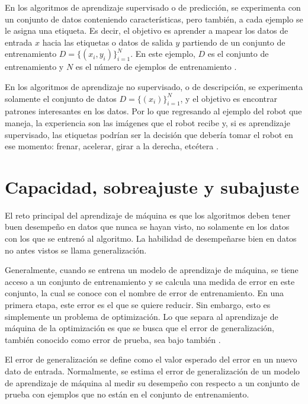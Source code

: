 \vspace{1em}

En los algoritmos de aprendizaje supervisado o de predicción, se experimenta con un conjunto de datos conteniendo características, pero también, a cada ejemplo se le asigna una etiqueta. Es decir, el objetivo es aprender a mapear los datos de entrada $x$ hacia las etiquetas o datos de salida $y$ partiendo de un conjunto de entrenamiento $D = \{(x_i, y_i)\}_{i=1}^N$. En este ejemplo, $D$ es el conjunto de entrenamiento y $N$ es el número de ejemplos de entrenamiento \cite{Murphy:2012:MLP:2380985}.

\vspace{1em}

En los algoritmos de aprendizaje no supervisado, o de descripción, se experimenta solamente el conjunto de datos $D = \{(x_i)\}_{i=1}^N$, y el objetivo es encontrar patrones interesantes en los datos. Por lo que regresando al ejemplo del robot que maneja, la experiencia son las imágenes que el robot recibe y, si es aprendizaje supervisado, las etiquetas podrían ser la decisión que debería tomar el robot en ese momento: frenar, acelerar, girar a la derecha, etcétera \cite{Murphy:2012:MLP:2380985}.

\section{Capacidad, sobreajuste y subajuste}
El reto principal del aprendizaje de máquina es que los algoritmos deben tener buen desempeño en datos que nunca se hayan visto, no solamente en los datos con los que se entrenó al algoritmo. La habilidad de desempeñarse bien en datos no antes vistos se llama generalización.


\vspace{1em}

Generalmente, cuando se entrena un modelo de aprendizaje de máquina, se tiene acceso a un conjunto de entrenamiento y se calcula una medida de error en este conjunto, la cual se conoce con el nombre de error de entrenamiento. En una primera etapa, este error es el que se quiere reducir. Sin embargo, esto es simplemente un problema de optimización. Lo que separa al aprendizaje de máquina de la optimización es que se busca que el error de generalización, también conocido como error de prueba, sea bajo también \cite{goodfellow-et-al-2016}.

\vspace{1em}

El error de generalización se define como el valor esperado del error en un nuevo dato de entrada. Normalmente, se estima el error de generalización de un modelo de aprendizaje de máquina al medir su desempeño con respecto a un conjunto de prueba con ejemplos que no están en el conjunto de entrenamiento. 

